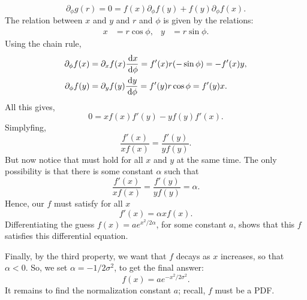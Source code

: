 \begin{exercise}
\begin{solution}
\begin{equation}
\label{eq:5}
\partial_{\phi} g(r) = 0 = f(x) \partial_{\phi}f(y) + f(y) \partial_{\phi}f(x).
\end{equation}
The relation between $x$ and $y$ and $r$ and $\phi$ is given by the relations:
\begin{align}
\label{eq:6}
x &= r \cos \phi, & y&=r\sin \phi.
\end{align}
Using the chain rule,
\begin{align}
  \label{eq:7}
  \partial_{\phi} f(x) &= \partial_{x} f(x) \frac{\,\textrm{d}x}{\,\textrm{d}\phi} = f'(x) r (-\sin \phi) = - f'(x) y, \\
  \partial_{\phi} f(y) &= \partial_{y} f(y) \frac{\,\textrm{d}y}{\,\textrm{d}\phi} = f'(y) r \cos \phi =  f'(y) x.
\end{align}
All this gives,
\begin{equation}
\label{eq:8}
0 = x f(x) f'(y) - y f(y)f'(x).
\end{equation}
Simplyfing,
\begin{equation}
  \label{eq:9}
   \frac{f'(x)}{x f(x)} = \frac{f'(y)}{ y f(y)}.
\end{equation}
But now notice that must hold for all $x$ and $y$ at the same time. The only possibility is that there is some constant $\alpha$ such that
\begin{equation}
\label{eq:10}
   \frac{f'(x)}{x f(x)} =  \frac{f'(y)}{y f(y)} = \alpha.
\end{equation}
Hence, our $f$ must satisfy for all $x$
\begin{equation}
\label{eq:11}
f'(x) = \alpha x f(x).
\end{equation}
Differentiating the guess $f(x) = a e^{ x^2/{2 \alpha}}$, for some constant $a$, shows that this $f$ satisfies this differential equation.

Finally, by the third property, we want that $f$ decays as  $x$ increases, so that $\alpha<0$. So, we set $\alpha = -1/2\sigma^{2}$, to get the final answer:
\begin{equation}
  \label{eq:12}
  f(x) = a e^{-x^{2}/2 \sigma^{2}}.
\end{equation}
It remains to find the normalization constant $a$; recall, $f$ must be a PDF.
\end{solution}
\end{exercise}

